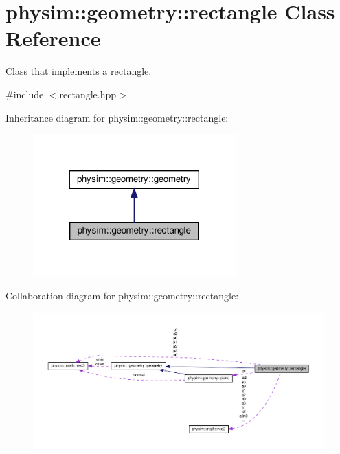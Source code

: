 \hypertarget{classphysim_1_1geometry_1_1rectangle}{}\section{physim\+:\+:geometry\+:\+:rectangle Class Reference}
\label{classphysim_1_1geometry_1_1rectangle}


Class that implements a rectangle.  




{\ttfamily \#include $<$rectangle.\+hpp$>$}



Inheritance diagram for physim\+:\+:geometry\+:\+:rectangle\+:\nopagebreak
\begin{figure}[H]
\begin{center}
\leavevmode
\includegraphics[width=221pt]{classphysim_1_1geometry_1_1rectangle__inherit__graph}
\end{center}
\end{figure}


Collaboration diagram for physim\+:\+:geometry\+:\+:rectangle\+:
\nopagebreak
\begin{figure}[H]
\begin{center}
\leavevmode
\includegraphics[width=350pt]{classphysim_1_1geometry_1_1rectangle__coll__graph}
\end{center}
\end{figure}
